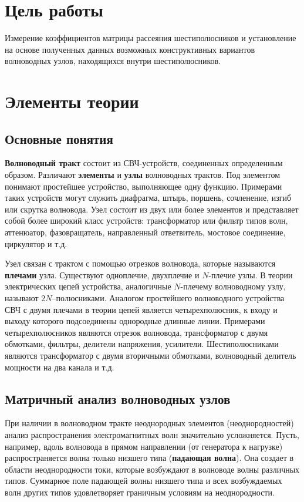 ﻿\documentclass[a4paper,11pt]{article}
\begin{document}
\section{Цель работы}

Измерение коэффициентов матрицы рассеяния шестиполюсников и установление на основе полученных данных возможных конструктивных вариантов волноводных узлов, находящихся внутри шестиполюсников.

\section{Элементы теории}
\subsection{Основные понятия}

\textbf{Волноводный тракт} состоит из СВЧ-устройств, соединенных определенным образом. Различают \textbf{элементы} и \textbf{узлы} волноводных трактов. Под элементом понимают простейшее устройство, выполняющее одну функцию. Примерами таких устройств могут служить диафрагма, штырь, поршень, сочленение, изгиб или скрутка волновода. Узел состоит из двух или более элементов и представляет собой более широкий класс устройств: трансформатор или фильтр типов волн, аттенюатор, фазовращатель, направленный ответвитель, мостовое соединение, циркулятор и т.д.

Узел связан с трактом с помощью отрезков волновода, которые называются \textbf{плечами} узла. Существуют одноплечие, двухплечие и $N$-плечие узлы. В теории электрических цепей устройства, аналогичные $N$-плечему волноводному узлу, называют $2N$--полюсниками. 
Аналогом простейшего волноводного устройства СВЧ с двумя плечами в теории цепей является четырехполюсник, к входу и выходу которого подсоединены однородные длинные линии. Примерами четырехполюсников являются отрезок волновода, трансформатор с двумя обмотками, фильтры, делители напряжения, усилители. Шестиполюсниками являются трансформатор с двумя вторичными обмотками, волноводный делитель мощности на два канала и т.д.

\subsection{Матричный анализ волноводных узлов}

При наличии в волноводном тракте неоднородных элементов (неоднородностей) анализ распространения электромагнитных волн значительно усложняется. 
Пусть, например, вдоль волновода в прямом направлении (от генератора к нагрузке) распространяется волна только низшего типа (\textbf{падающая волна}). 
Она создает в области неоднородности токи, которые возбуждают в волноводе волны различных типов. 
Суммарное поле падающей волны низшего типа и всех возбуждаемых волн других типов удовлетворяет  граничным условиям на неоднородности.
\end{document}
